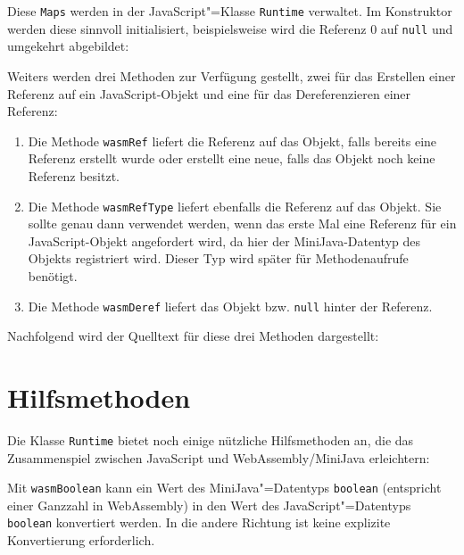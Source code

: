 Diese \lstinline{Maps} werden in der JavaScript"=Klasse \lstinline{Runtime} verwaltet. Im Konstruktor werden diese sinnvoll initialisiert, beispielsweise wird die Referenz 0 auf \lstinline{null} und umgekehrt abgebildet:



Weiters werden drei Methoden zur Verfügung gestellt, zwei für das Erstellen einer Referenz auf ein JavaScript-Objekt und eine für das Dereferenzieren einer Referenz:
\begin{enumerate}
    \item Die Methode \lstinline{wasmRef} liefert die Referenz auf das Objekt, falls bereits eine Referenz erstellt wurde oder erstellt eine neue, falls das Objekt noch keine Referenz besitzt.
    \item Die Methode \lstinline{wasmRefType} liefert ebenfalls die Referenz auf das Objekt. Sie sollte genau dann verwendet werden, wenn das erste Mal eine Referenz für ein Ja\-va\-Script-Ob\-jekt angefordert wird, da hier der MiniJava-Datentyp des Objekts registriert wird. Dieser Typ wird später für Methodenaufrufe benötigt.
    \item Die Methode \lstinline{wasmDeref} liefert das Objekt bzw. \lstinline{null} hinter der Referenz.
\end{enumerate}

Nachfolgend wird der Quelltext für diese drei Methoden dargestellt:



\pagebreak


\section{Hilfsmethoden}

Die Klasse \lstinline{Runtime} bietet noch einige nützliche Hilfsmethoden an, die das Zusammenspiel zwischen JavaScript und WebAssembly/MiniJava erleichtern:



Mit \lstinline{wasmBoolean} kann ein Wert des MiniJava"=Datentyps \lstinline{boolean} (entspricht einer Ganzzahl in WebAssembly) in den Wert des JavaScript"=Datentyps \lstinline{boolean} konvertiert werden. In die andere Richtung ist keine explizite Konvertierung erforderlich.

